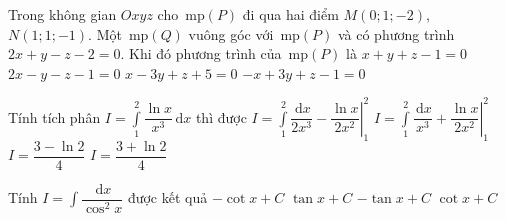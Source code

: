 \begin{ex}%
Trong không gian $Oxyz$ cho $\mathrm{\,mp}(P)$ đi qua hai điểm $M(0;1;-2)$, $N(1;1;-1)$. Một $\mathrm{\,mp}(Q)$ vuông góc với $\mathrm{\,mp}(P)$ và có phương trình $2x+y-z-2=0$. Khi đó phương trình của $\mathrm{\,mp}(P)$ là
\choice
{$x+y+z-1=0$}
{$2x-y-z-1=0$}
{$x-3y+z+5=0$}
{\True $-x+3y+z-1=0$}
\end{ex}


\begin{ex}%
Tính tích phân $I=\displaystyle\int\limits_1^2{\dfrac{\ln x}{x^3}\mathrm{\,d}x}$ thì được
\choice
{\True $I=\displaystyle\int\limits_1^2{\dfrac{\mathrm{\,d}x}{2x^3}}-\left.\dfrac{\ln x}{2x^2}\right|_1^2$}
{$I=\displaystyle\int\limits_1^2{\dfrac{\mathrm{\,d}x}{x^3}}+\left.\dfrac{\ln x}{2x^2}\right|_1^2$}
{$I=\dfrac{3-\ln 2}{4}$}
{$I=\dfrac{3+\ln 2}{4}$}
\end{ex}

\begin{ex}%
Tính $I=\displaystyle\int{\dfrac{\mathrm{\,d}x}{\cos^2x}}$ được kết quả
\choice
{$-\cot x+C$}
{\True $\tan x+C$}
{$-\tan x+C$}
{$\cot x+C$}
\end{ex}


